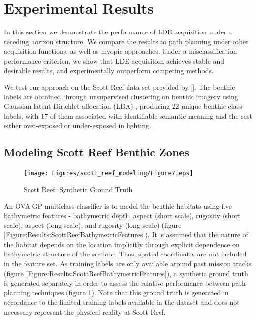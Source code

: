 \documentclass{article}
\newcommand{\incite}[1]{\citeauthor{#1} [\citeyear{#1}]}
\begin{document}
\section{Experimental Results}
\label{Section:ExperimentalResults}

	In this section we demonstrate the performance of LDE acquisition under a receding horizon structure. We compare the results to path planning under other acquisition functions, as well as myopic approaches. Under a misclassification performance criterion, we show that LDE acquisition achieves stable and desirable results, and experimentally outperform competing methods.
	
	We test our approach on the Scott Reef data set provided by \incite{IMOS}. The benthic labels are obtained through unsupervised clustering on benthic imagery using Gaussian latent Dirichlet allocation (LDA) \cite{Steinberg2015128}, producing 22 unique benthic class labels, with 17 of them associated with identifiable semantic meaning and the rest either over-exposed or under-exposed in lighting. 

	\subsection{Modeling Scott Reef Benthic Zones}

		\begin{figure}[t]
		\fontsize{24}{12}\selectfont
		\centering
			\texttt{[image: Figures/scott\_reef\_modeling/Figure7.eps]}
		\caption{Scott Reef: Synthetic Ground Truth}
		\label{Figure:Results:ScottReefSyntheticGroundTruth}
		\end{figure}
		
		An OVA GP multiclass classifier is to model the benthic habitats using five bathymetric features - bathymetric depth, aspect (short scale), rugosity (short scale), aspect (long scale), and rugosity (long scale) (figure \ref{Figure:Results:ScottReefBathymetricFeatures}). It is assumed that the nature of the habitat depends on the location implicitly through explicit dependence on bathymetric structure of the seafloor. Thus, spatial coordinates are not included in the feature set. As training labels are only available around past mission tracks (figure \ref{Figure:Results:ScottReefBathymetricFeatures}), a synthetic ground truth is generated separately in order to assess the relative performance between path-planning techniques (figure \ref{Figure:Results:ScottReefSyntheticGroundTruth}). Note that this ground truth is generated in accordance to the limited training labels available in the dataset and does not necessary represent the physical reality at Scott Reef. 
\end{document}
